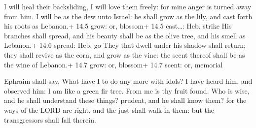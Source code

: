  I will heal their backsliding, I will love them freely:
for mine anger is turned away from him.  I will be as the
dew unto Israel: he shall grow as the lily, and cast forth his roots as
Lebanon.+ 14.5 grow: or, blossom+ 14.5 cast\ldots: Heb. strike
 His branches shall spread, and his beauty shall be as the
olive tree, and his smell as Lebanon.+ 14.6 spread: Heb. go 
They that dwell under his shadow shall return; they shall revive as the
corn, and grow as the vine: the scent thereof shall be as the wine of
Lebanon.+ 14.7 grow: or, blossom+ 14.7 scent: or, memorial

 Ephraim shall say, What have I to do any more with idols? I
have heard him, and observed him: I am like a green fir tree. From me is
thy fruit found.  Who is wise, and he shall understand these
things? prudent, and he shall know them? for the ways of the LORD are
right, and the just shall walk in them: but the transgressors shall fall
therein.
